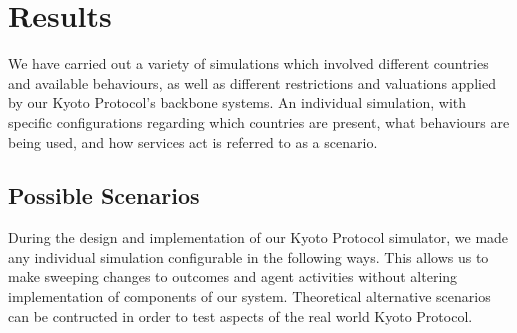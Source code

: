 \section{Results}

We have carried out a variety of simulations which involved different countries and available behaviours, as well as different restrictions and valuations applied by our Kyoto Protocol's backbone systems. An individual simulation, with specific configurations regarding which countries are present, what behaviours are being used, and how services act is referred to as a scenario.

\subsection{Possible Scenarios}

During the design and implementation of our Kyoto Protocol simulator, we made any individual simulation configurable in the following ways. This allows us to make sweeping changes to outcomes and agent activities without altering implementation of components of our system. Theoretical alternative scenarios can be contructed in order to test aspects of the real world Kyoto Protocol.

